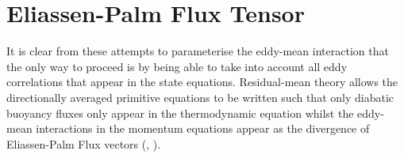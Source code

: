 \documentclass[12pt,a4paper]{report}
\begin{document}
                
                
                \section{Eliassen-Palm Flux Tensor}
                
                It is clear from these attempts to parameterise the eddy-mean interaction
                that the only way to proceed is by being able to take into account 
                all eddy correlations that appear in the state equations. Residual-mean theory
                allows the directionally averaged primitive equations to be written such that 
                only diabatic buoyancy
                fluxes only appear in the thermodynamic equation whilst the eddy-mean
                interactions in the momentum equations appear as the divergence of Eliassen-Palm 
                Flux vectors (\cite{eliassen1961transfer}, \cite{andrews1976planetary}). 
                
\end{document}
